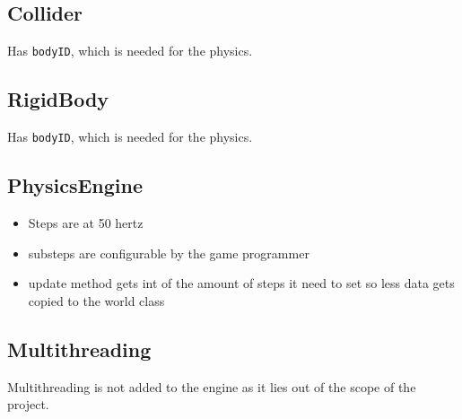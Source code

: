 \documentclass{article}
\begin{document}
\subsection{Collider}
Has \texttt{bodyID}, which is needed for the physics.

\subsection{RigidBody}
Has \texttt{bodyID}, which is needed for the physics.

\subsection{PhysicsEngine}{
  \begin{itemize}
    \item Steps are at 50 hertz
    \item substeps are configurable by the game programmer
    \item update method gets int of the amount of steps it need to set so less data gets copied to the world class
  \end{itemize}
}

\subsection{Multithreading}
Multithreading is not added to the engine as it lies out of the scope of the project.
\end{document}
